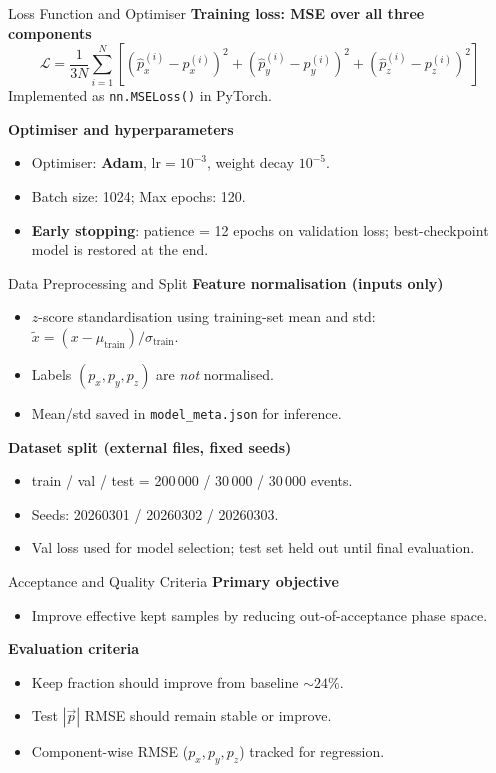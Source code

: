 \documentclass[11pt]{beamer}
\begin{document}
\begin{frame}{Loss Function and Optimiser}
\textbf{Training loss: MSE over all three components}
\[
  \mathcal{L} = \frac{1}{3N}\sum_{i=1}^{N}
  \left[(\hat{p}_x^{(i)}-p_x^{(i)})^2
       +(\hat{p}_y^{(i)}-p_y^{(i)})^2
       +(\hat{p}_z^{(i)}-p_z^{(i)})^2\right]
\]
Implemented as \texttt{nn.MSELoss()} in PyTorch.

\textbf{Optimiser and hyperparameters}
\begin{itemize}
  \item Optimiser: \textbf{Adam}, \(\text{lr}=10^{-3}\), weight decay \(10^{-5}\).
  \item Batch size: 1024; Max epochs: 120.
  \item \textbf{Early stopping}: patience = 12 epochs on validation loss;
        best-checkpoint model is restored at the end.
\end{itemize}
\end{frame}

\begin{frame}{Data Preprocessing and Split}
\textbf{Feature normalisation (inputs only)}
\begin{itemize}
  \item \(z\)-score standardisation using training-set mean and std:
        \(\tilde{x} = (x - \mu_\text{train})/\sigma_\text{train}\).
  \item Labels \((p_x, p_y, p_z)\) are \emph{not} normalised.
  \item Mean/std saved in \texttt{model\_meta.json} for inference.
\end{itemize}

\textbf{Dataset split (external files, fixed seeds)}
\begin{itemize}
  \item train / val / test = 200\,000 / 30\,000 / 30\,000 events.
  \item Seeds: 20260301 / 20260302 / 20260303.
  \item Val loss used for model selection; test set held out until final evaluation.
\end{itemize}
\end{frame}

\begin{frame}{Acceptance and Quality Criteria}
\textbf{Primary objective}
\begin{itemize}
\item Improve effective kept samples by reducing out-of-acceptance phase space.
\end{itemize}

\textbf{Evaluation criteria}
\begin{itemize}
\item Keep fraction should improve from baseline \(\sim24\%\).
\item Test \(|\vec{p}|\) RMSE should remain stable or improve.
\item Component-wise RMSE (\(p_x,p_y,p_z\)) tracked for regression.
\end{itemize}
\end{frame}
\end{document}
